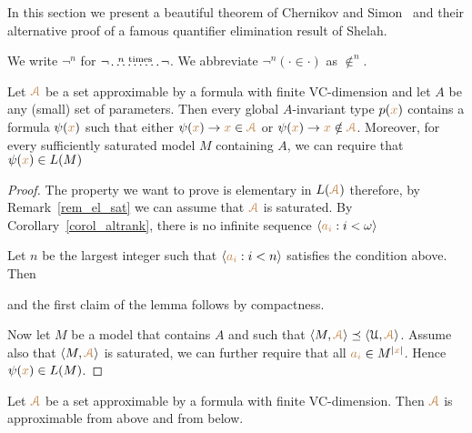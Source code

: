 \documentclass[creche.tex]{subfiles}
\begin{document}
In this section we present a beautiful theorem of Chernikov and Simon~\cite{CS} and their alternative proof of a famous quantifier elimination result of Shelah. 

We write \emph{$\neg^n$\/} for $\neg\!\stackrel{n\ \rm times}{\dots\dots\dots}\!\neg$. We abbreviate $\neg^n(\cdot\in\cdot)$ as \emph{$\notin^n$}.

\begin{lemma}\label{lem_honest}
Let ${\color{brown}{\EuScript A}}$ be a set approximable by a formula with finite VC-dimension and let $A$ be any (small) set of parameters. Then every global $A$-invariant type $p({\color{brown} x})$ contains a formula $\psi({\color{brown} x})$ such that either $\psi({\color{brown} x})\rightarrow {\color{brown}x}\in{\color{brown}{\EuScript A}}$ or $\psi({\color{brown} x})\rightarrow {\color{brown}x}\notin{\color{brown}{\EuScript A}}$. Moreover, for every sufficiently saturated model $M$ containing $A$, we can require that $\psi({\color{brown} x})\in L(M)$
\end{lemma}

\begin{proof}
The property we want to prove is elementary in $L({\color{brown}{\EuScript A}})$ therefore, by Remark~\ref{rem_el_sat} we can assume that ${\color{brown}{\EuScript A}}$ is saturated. By Corollary~\ref{corol_altrank}, there is no infinite sequence $\langle{\color{brown}a_i}:i<\omega\rangle$


Let $n$ be the largest integer such that $\langle{\color{brown}a_i}:i<n\rangle$ satisfies the condition above. Then


and the first claim of the lemma follows by compactness. 

Now let $M$ be a model that contains $A$ and such that $\langle M,{\color{brown}{\EuScript A}}\rangle\preceq\langle\EuScript U,{\color{brown}{\EuScript A}}\rangle$. Assume also that $\langle M,{\color{brown}{\EuScript A}}\rangle$ is saturated, we can further require that all ${\color{brown} a_i}\in M^{|{\color{brown} x}|}$. Hence $\psi({\color{brown} x})\in L(M)$.
\end{proof}

\begin{theorem}\label{thm_honest}
Let ${\color{brown}{\EuScript A}}$ be a set approximable by a formula with finite VC-dimension. Then ${\color{brown}{\EuScript A}}$ is approximable from above and from below.
\end{theorem}
\end{document}
